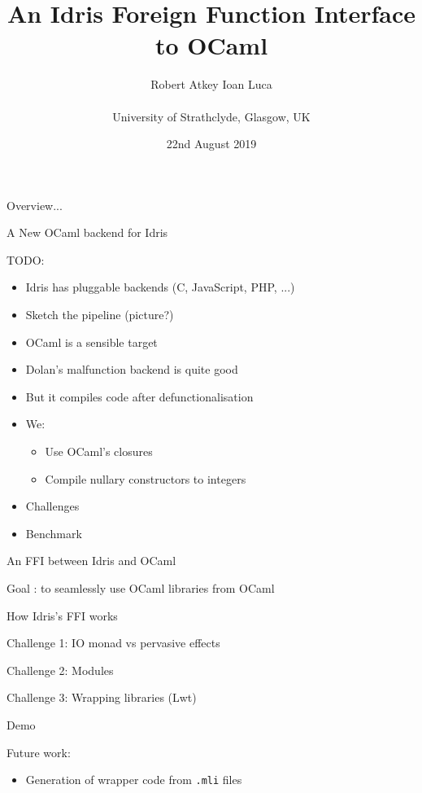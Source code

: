 \documentclass[serif,mathserif,aspectratio=169]{beamer}
\title{An Idris Foreign Function Interface to OCaml}
\author{Robert Atkey \qquad Ioan Luca\\
  \ \\
  University of Strathclyde, Glasgow, UK}
\date{22nd August 2019}
\begin{document}
\frame{\titlepage}

\newcommand{\youtem}{\quad \textcolor{titlered!80}{---} \quad}

\newcommand{\titlecard}[1]{\begin{frame}%
  \begin{center}%
    \Large \textcolor{titlered}{#1}%
  \end{center}%
\end{frame}}

\begin{frame}
  Overview...
\end{frame}

\titlecard{A New OCaml backend for Idris}

\begin{frame}
  TODO:
  \begin{itemize}
  \item Idris has pluggable backends (C, JavaScript, PHP, ...)
  \item Sketch the pipeline (picture?)
  \item OCaml is a sensible target
  \item Dolan's malfunction backend is quite good
  \item But it compiles code after defunctionalisation
  \item We:
    \begin{itemize}
    \item Use OCaml's closures
    \item Compile nullary constructors to integers
    \end{itemize}
  \item Challenges
  \item Benchmark
  \end{itemize}
\end{frame}

\titlecard{An FFI between Idris and OCaml}

\begin{frame}
  Goal : to seamlessly use OCaml libraries from OCaml
\end{frame}

\begin{frame}
  How Idris's FFI works
\end{frame}

\begin{frame}
  Challenge 1: IO monad vs pervasive effects
\end{frame}

\begin{frame}
  Challenge 2: Modules
\end{frame}

\begin{frame}
  Challenge 3: Wrapping libraries (Lwt)
\end{frame}

\titlecard{Demo}

\begin{frame}
  Future work:
  \begin{itemize}
  \item Generation of wrapper code from \texttt{.mli} files
  \end{itemize}
\end{frame}
\end{document}
